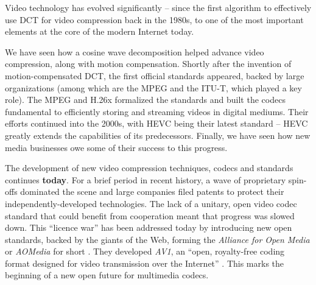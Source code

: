Video technology has evolved significantly -- since the first algorithm to effectively use DCT for video compression back in the 1980s, to one of the most important elements at the core of the modern Internet today.

We have seen how a cosine wave decomposition helped advance video compression, along with motion compensation.
Shortly after the invention of motion-compensated DCT, the first official standards appeared, backed by large organizations (among which are the MPEG and the ITU-T, which played a key role).
The MPEG and H.26x formalized the standards and built the codecs fundamental to efficiently storing and streaming videos in digital mediums.
Their efforts continued into the 2000s, with HEVC being their latest standard -- HEVC greatly extends the capabilities of its predecessors.
Finally, we have seen how new media businesses owe some of their success to this progress.

The development of new video compression techniques, codecs and standards continues \textbf{today}.
For a brief period in recent history, a wave of proprietary spin-offs dominated the scene and large companies filed patents to protect their independently-developed technologies.
The lack of a unitary, open video codec standard that could benefit from cooperation meant that progress was slowed down.
This ``licence war'' has been addressed today by introducing new open standards, backed by the giants of the Web, forming the \emph{Alliance for Open Media} or \emph{AOMedia} for short \cite{wiki:Alliance_for_Open_Media}.
They developed \emph{AV1}, an ``open, royalty-free coding format designed for video transmission over the Internet'' \cite{wiki:AV1}.
This marks the beginning of a new open future for multimedia codecs.
